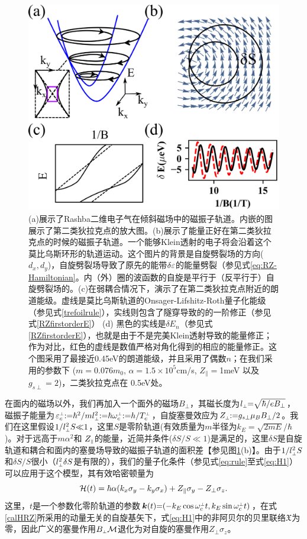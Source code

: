 \begin{figure}
	\includegraphics[width=0.8\columnwidth]{../figures/RZ.png}
	\centering
	\caption{(a)展示了Rashba二维电子气在倾斜磁场中的磁振子轨道。内嵌的图展示了第二类狄拉克点的放大图。(b)展示了能量正好在第二类狄拉克点的时候的磁振子轨道。一个能够Klein透射的电子将会沿着这个莫比乌斯环形的轨道运动。这个图片的背景是自旋劈裂场的方向($d_x,d_y$)，自旋劈裂场导致了原先的能带$\delta\varepsilon$的能量劈裂（参见式\ref{eq:RZ-Hamiltonian}。内（外）圈的波函数的自旋是平行于（反平行于）自旋劈裂场的。(c)在弱耦合情况下，演示了在第二类狄拉克点附近的朗道能级。虚线是莫比乌斯轨道的Onsager-Lifshitz-Roth量子化能级（参见式\ref{trefoilrule}），实线则包含了隧穿导致的的一阶修正（参见式\ref{RZfirstorderE}） (d) 黑色的实线是$\delta E_n$（参见式\ref{RZfirstorderE}），也就是由于不是完美Klein透射导致的能量修正；作为对比，红色的虚线是数值严格对角化得到的相应的能量修正。这个图采用了最接近0.45eV的朗道能级，并且采用了偶数$n$；在我们采用的参数下 ($m{=}0.076m_0$, $\alpha{=} 1.5\times10^{5}$cm/s, $Z_\parallel {=}$1meV 以及 $g_{s\perp}=2$)，二类狄拉克点在 0.5eV处。 
	\label{fig:RZ}}
\end{figure}

在面内的磁场以外，我们再加入一个面外的磁场$B_{\perp}$，其磁长度为$l_{\scriptscriptstyle{\perp}}{=}\sqrt{\hbar/eB_{\perp}}$，磁振子能量为$\varepsilon^{\scriptscriptstyle{\perp}}_c{:}{=}\hbar^2/ml_{\scriptscriptstyle{\perp}}^2{:}{=}\hbar \omega_c^{\scriptscriptstyle{\perp}}{:}{=}h/T_c^{\scriptscriptstyle{\perp}}$，自旋塞曼效应为$Z_{\scriptscriptstyle{\perp}}{:}{=}{g_{s\perp}}\mu_B B_{\perp}/2$。我们在这里假设$1/l_{\scriptscriptstyle{\perp}}^2S{\ll}1$，这里$S$是零阶轨道(有效质量为$m$半径为$k_E{=}\sqrt{2mE}/\hbar$)。对于远高于$m\alpha^2$和 $Z_{\scriptscriptstyle{\parallel}}$的能量，近简并条件($\delta S/S{\ll}1$)是满足的，这里$\delta S$是自旋轨道和耦合和面内的塞曼场导致的磁振子轨道的面积差【参见图\ref{fig:RZ}(b)】。由于$1/l_{\scriptscriptstyle{\perp}}^2S$和$\delta S/S$很小（$l_{\scriptscriptstyle{\perp}}^2\delta S$是有限的），我们的量子化条件（参见式\ref{eq:rule}至式\ref{eq:H1}）可以应用于这个模型，其有效哈密顿量为
\begin{equation}
{\cal H}(t)=\hbar\alpha(k_{x}\sigma_{y}-k_{y}\sigma_{x})+Z_\parallel\sigma_{y}-Z_\perp\sigma_{z}.\label{calHRZ}
\end{equation}
这里，$t$是一个参数化零阶轨道的参数$\boldsymbol{k}(t){=}({-}k_E \cos \omega_c^{\scriptscriptstyle{\perp}} t, k_E \sin \omega_c^{\scriptscriptstyle{\perp}} t)$，在式\ref{calHRZ}所采用的动量无关的自旋基矢下，式\ref{eq:H1}中的非阿贝尔的贝里联络$\mathfrak{X}$为零，因此广义的塞曼作用$B_{\scriptscriptstyle{\perp}}{\cal M}$退化为对自旋的塞曼作用$Z_\perp\sigma_{z}$。

